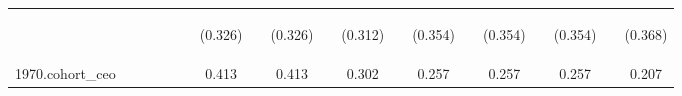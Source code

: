 \begin{center}
\begin{tabular}{lcccccccccccccccccc}
\vspace{4pt} & \begin{footnotesize}\end{footnotesize} & \begin{footnotesize}\end{footnotesize} & \begin{footnotesize}\end{footnotesize} & \begin{footnotesize}\end{footnotesize} & \begin{footnotesize}\end{footnotesize} & \begin{footnotesize}(0.326)\end{footnotesize} & \begin{footnotesize}\end{footnotesize} & \begin{footnotesize}(0.326)\end{footnotesize} & \begin{footnotesize}\end{footnotesize} & \begin{footnotesize}(0.312)\end{footnotesize} & \begin{footnotesize}\end{footnotesize} & \begin{footnotesize}(0.354)\end{footnotesize} & \begin{footnotesize}\end{footnotesize} & \begin{footnotesize}(0.354)\end{footnotesize} & \begin{footnotesize}\end{footnotesize} & \begin{footnotesize}(0.354)\end{footnotesize} & \begin{footnotesize}\end{footnotesize} & \begin{footnotesize}(0.368)\end{footnotesize} \\
1970.cohort\_ceo &  &  &  &  &  & 0.413 &  & 0.413 &  & 0.302 &  & 0.257 &  & 0.257 &  & 0.257 &  & 0.207 \\

\end{tabular}
\end{center}
